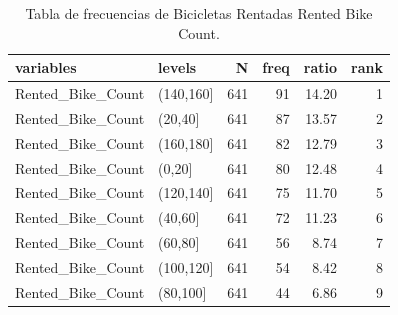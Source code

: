 \documentclass[]{elsarticle} %
\begin{document}
\begin{table}

\caption{\label{tab:tab2}\label{tab:tab2}Tabla de frecuencias de Bicicletas Rentadas Rented Bike Count.}
\centering
\begin{tabular}[t]{l|l|r|r|r|r}
\hline
variables & levels & N & freq & ratio & rank\\
\hline
Rented\_Bike\_Count & (140,160] & 641 & 91 & 14.20 & 1\\
\hline
Rented\_Bike\_Count & (20,40] & 641 & 87 & 13.57 & 2\\
\hline
Rented\_Bike\_Count & (160,180] & 641 & 82 & 12.79 & 3\\
\hline
Rented\_Bike\_Count & (0,20] & 641 & 80 & 12.48 & 4\\
\hline
Rented\_Bike\_Count & (120,140] & 641 & 75 & 11.70 & 5\\
\hline
Rented\_Bike\_Count & (40,60] & 641 & 72 & 11.23 & 6\\
\hline
Rented\_Bike\_Count & (60,80] & 641 & 56 & 8.74 & 7\\
\hline
Rented\_Bike\_Count & (100,120] & 641 & 54 & 8.42 & 8\\
\hline
Rented\_Bike\_Count & (80,100] & 641 & 44 & 6.86 & 9\\
\hline
\end{tabular}
\end{table}
\end{document}
